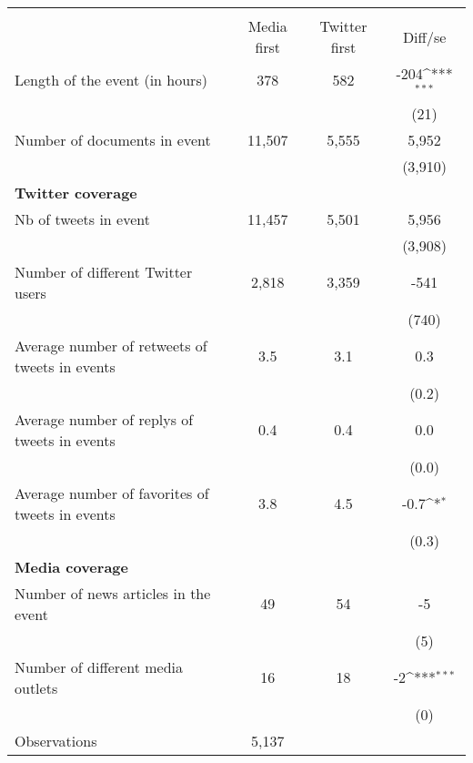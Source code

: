{
\def\sym#1{\ifmmode^{#1}\else\(^{#1}\)\fi}
\begin{tabular}{l*{1}{ccc}}
\hline\hline
                    &\multicolumn{3}{c}{ }                          \\
                    & Media first&Twitter first&     Diff/se         \\
\hline
Length of the event (in hours)&         378&         582&        -204\sym{***}\\
                    &            &            &        (21)         \\
Number of documents in event&      11,507&       5,555&       5,952         \\
                    &            &            &     (3,910)         \\
\textbf{Twitter coverage}&            &            &                     \\
Nb of tweets in event&      11,457&       5,501&       5,956         \\
                    &            &            &     (3,908)         \\
Number of different Twitter users&       2,818&       3,359&        -541         \\
                    &            &            &       (740)         \\
Average number of retweets of tweets in events&         3.5&         3.1&         0.3         \\
                    &            &            &       (0.2)         \\
Average number of replys of tweets in events&         0.4&         0.4&         0.0         \\
                    &            &            &       (0.0)         \\
Average number of favorites of tweets in events&         3.8&         4.5&        -0.7\sym{*}  \\
                    &            &            &       (0.3)         \\
\textbf{Media coverage}&            &            &                     \\
Number of news articles in the event&          49&          54&          -5         \\
                    &            &            &         (5)         \\
Number of different media outlets&          16&          18&          -2\sym{***}\\
                    &            &            &         (0)         \\
\hline
Observations        &       5,137&            &                     \\
\hline\hline
\end{tabular}
}
